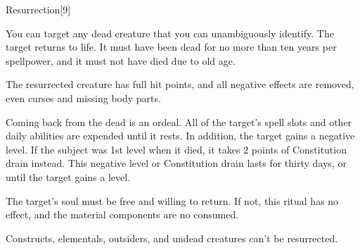 \begin{spellsection}[Greater]{Resurrection}[9]
    \begin{spellheader}
    \end{spellheader}
    \begin{spellcontent}
        \begin{spelltargetinginfo}
        \end{spelltargetinginfo}
        \begin{spelleffects}
            \spellspecial You can target any dead creature that you can unambiguously identify.
            \spelleffect The target returns to life. It must have been dead for no more than ten years per spellpower, and it must not have died due to old age.

            The resurrected creature has full hit points, and all negative effects are removed, even curses and missing body parts.

            \par Coming back from the dead is an ordeal. All of the target's spell slots and other daily abilities are expended until it rests. In addition, the target gains a negative level. If the subject was 1st level when it died, it takes 2 points of Constitution drain instead. This negative level or Constitution drain lasts for thirty days, or until the target gains a level.
        \end{spelleffects}
    \end{spellcontent}
    \begin{spellfooter}
        \spellnotes The target's soul must be free and willing to return. If not, this ritual has no effect, and the material components are no consumed.

        Constructs, elementals, outsiders, and undead creatures can't be resurrected.
    \end{spellfooter}
\end{spellsection}

